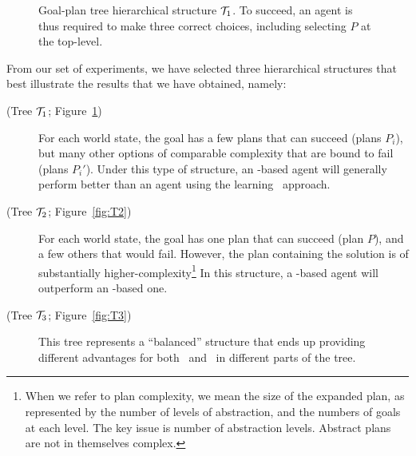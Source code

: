 \begin{figure}[t]
\begin{center}

\end{center}
\caption{Goal-plan tree hierarchical structure ${\mathcal{T}}_1$. To succeed, an agent is thus required to make
three correct choices, including selecting $P$ at the top-level.}
\label{fig:T1}
\end{figure}


From our set of experiments, we have selected three hierarchical structures that
best illustrate the results that we have obtained, namely:
\begin{description}
\item[(Tree ${\mathcal{T}}_1$; Figure~\ref{fig:T1})] For each world state, the
goal has a few plans that can succeed (plans $P_i$), but many other options of comparable
complexity that are bound to fail (plans $P_i'$). 
Under this type of structure, an \CL-based agent will generally perform better 
than an agent using the learning \BUL\ approach.

\item[(Tree ${\mathcal{T}}_2$; Figure~\ref{fig:T2})] For each world state, the goal has
one plan that can succeed (plan $P$), and a few others that would fail.
However, the plan containing the solution is of substantially
higher-complexity\footnote{When we refer to plan complexity, we mean
the size of the expanded plan, as represented by the number of levels
of abstraction, and the numbers of goals at each level. The key issue
is number of abstraction levels. Abstract plans are not in themselves complex.}
In this structure, a \BUL-based agent will outperform an \CL-based one.

\item[(Tree ${\mathcal{T}}_3$; Figure~\ref{fig:T3})] This tree represents a ``balanced''
structure that ends up providing different advantages for both \BUL\ and \CL\ in
different parts of the tree.
\end{description}



